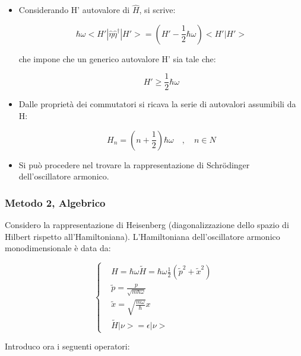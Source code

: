 \documentclass{article}
\begin{document}
\begin{itemize}
    \item Considerando H' autovalore di $\hat{H}$, si scrive:

          \begin{equation}
              \hbar \omega<H' |\hat{\eta}\hat{\eta}^{\dagger}|H'>=(H'-\frac{1}{2}\hbar \omega)<H' |H'>
          \end{equation}

          che impone che un generico autovalore H' sia tale che:

          \begin{equation}
              H'\geq \frac{1}{2}\hbar \omega
          \end{equation}

    \item Dalle proprietà dei commutatori si ricava la serie di autovalori assumibili da H:

          \begin{equation}
              H_n=(n+\frac{1}{2})\hbar \omega \quad , \quad n \in N
          \end{equation}

    \item Si può procedere nel trovare la rappresentazione di Schrödinger dell'oscillatore armonico.
\end{itemize}

\subsubsection{Metodo 2, Algebrico}

Considero la rappresentazione di Heisenberg (diagonalizzazione dello spazio di Hilbert rispetto all'Hamiltoniana).
L'Hamiltoniana dell'oscillatore armonico monodimensionale è data da:

\begin{equation}
    \left\{
    \begin{aligned}
         & H=\hbar\omega\tilde{H}=\hbar\omega\frac{1}{2}(\tilde{p}^2+\tilde{x}^2) \\
         & \tilde{p}=\frac{p}{\sqrt{m\hbar \omega}}                               \\
         & \tilde{x}= \sqrt{\frac{m\omega}{\hbar}}x                               \\
         & \tilde{H}|\nu>=\epsilon|\nu>
    \end{aligned}
    \right.
\end{equation}

Introduco ora i seguenti operatori:
\end{document}

